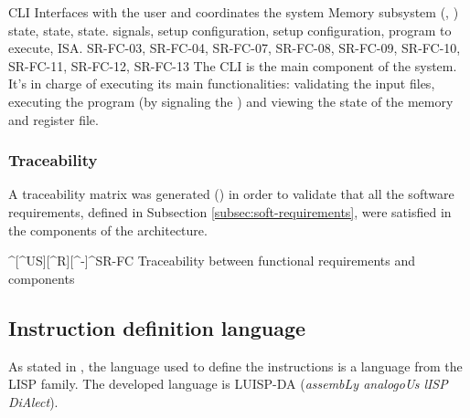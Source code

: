 \begin{component}{CLI}
  {Interfaces with the user and coordinates the system}  %
  {Memory subsystem (, )}  %
  { state,  state,  state.}  %
  { signals,  setup configuration,  setup configuration, program to execute, \gls{ISA}.}  %
  {SR-FC-03, SR-FC-04, SR-FC-07, SR-FC-08, SR-FC-09, SR-FC-10, SR-FC-11, SR-FC-12, SR-FC-13}  %
  The \gls{CLI} is the main component of the system. It's in charge of executing its main functionalities: validating the input files, executing the program (by signaling the ) and viewing the state of the memory and \gls{register} file.
\end{component}

\FloatBarrier




\subsubsection{Traceability}\label{subsec:comp-traceability}
A traceability matrix was generated () in order to validate that all the software requirements, defined in Subsection \ref{subsec:soft-requirements}, were satisfied in the components of the architecture.

  {^[^US][^R][^-]}{^SR-FC}
  {Traceability between functional requirements and components}

\FloatBarrier


\subsection{Instruction definition language}\label{subsec:inst-lang-design}
As stated in , the language used to define the instructions is a language from the LISP family. The developed language is LUISP-DA (\textit{assembLy analogoUs lISP DiAlect}).

